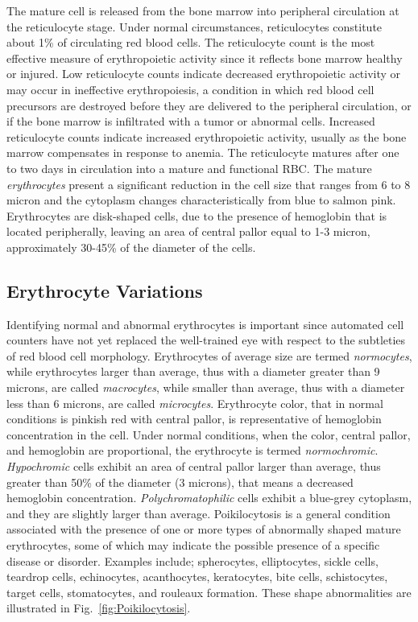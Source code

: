 \documentclass[final,a4paper,12pt,english]{UnicaPhdThesis3}
\begin{document}
{The mature cell is released from the bone marrow into peripheral circulation at the reticulocyte stage. Under normal circumstances, reticulocytes constitute about 1\% of circulating red blood cells. The reticulocyte count is the most effective measure of erythropoietic activity since it reflects bone marrow healthy or injured. Low reticulocyte counts indicate decreased erythropoietic activity or may occur in ineffective erythropoiesis, a condition in which red blood cell precursors are destroyed before they are delivered to the peripheral circulation, or if the bone marrow is infiltrated with a tumor or abnormal cells. Increased reticulocyte counts indicate increased erythropoietic activity, usually as the bone marrow compensates in response to anemia. The reticulocyte matures after one to two days in circulation into a mature and functional RBC. The mature \textit{erythrocytes} present a significant reduction in the cell size that ranges from 6 to 8 micron and the cytoplasm changes characteristically from blue to salmon pink. Erythrocytes are disk-shaped cells, due to the presence of hemoglobin that is located peripherally, leaving an area of central pallor equal to 1-3 micron, approximately 30-45\% of the diameter of the cells. 

\subsection{Erythrocyte Variations}
Identifying normal and abnormal erythrocytes is important since automated cell counters have not yet replaced the well-trained eye with respect to the subtleties of red blood cell morphology. Erythrocytes of average size are termed \textit{normocytes}, while erythrocytes larger than average, thus with a diameter greater than 9 microns, are called \textit{macrocytes}, while smaller than average, thus with a diameter less than 6 microns, are called \textit{microcytes}. Erythrocyte color, that in normal conditions is pinkish red with central pallor, is representative of hemoglobin concentration in the cell. Under normal conditions, when the color, central pallor, and hemoglobin are proportional, the erythrocyte is termed \textit{normochromic}. \textit{Hypochromic} cells exhibit an area of central pallor larger than average, thus greater than 50\% of the diameter (3 microns), that means a decreased hemoglobin concentration. \textit{Polychromatophilic} cells exhibit a blue-grey cytoplasm, and they are slightly larger than average. Poikilocytosis is a general condition associated with the presence of one or more types of abnormally shaped mature erythrocytes, some of which may indicate the possible presence of a specific disease or disorder. Examples include; spherocytes, elliptocytes, sickle cells, teardrop cells, echinocytes, acanthocytes, keratocytes, bite cells, schistocytes, target cells, stomatocytes, and rouleaux formation. These shape abnormalities are illustrated in Fig.~\ref{fig:Poikilocytosis}.

}
\end{document}
